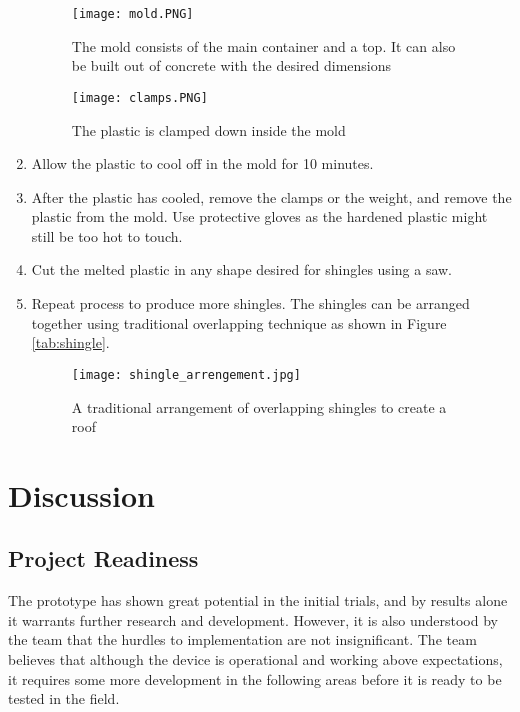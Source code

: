 \documentclass[11pt,english]{article}
\begin{document}
\begin{enumerate}
\begin{figure}[ht!]
\centering
\texttt{[image: mold.PNG]}
\caption{The mold consists of the main container and a top. It can also be built out of concrete with the desired dimensions}
\label{fig:mold}
\end{figure}

\begin{figure}[ht!]
\centering
\texttt{[image: clamps.PNG]}
\caption{The plastic is clamped down inside the mold}
\label{fig:clamps}
\end{figure}


\item Allow the plastic to cool off in the mold for 10 minutes.
\item After the plastic has cooled, remove the clamps or the weight, and remove the plastic from the mold. Use protective gloves as the hardened plastic might still be too hot to touch.
\item Cut the melted plastic in any shape desired for shingles using a saw.
\item Repeat process to produce more shingles. The shingles can be arranged together using traditional overlapping technique as shown in Figure \ref{tab:shingle}.

\begin{figure}[ht!]
\centering
\texttt{[image: shingle\_arrengement.jpg]}
\caption{A traditional arrangement of overlapping shingles to create a roof}
\label{fig:shingle}
\end{figure}
\end{enumerate}


\pagebreak
\section{Discussion}

\subsection{Project Readiness}
The prototype has shown great potential in the initial trials, and by results alone it warrants further research and development. However, it is also understood by the team that the hurdles to implementation are not insignificant. The team believes that although the device is operational and working above expectations, it requires some more development in the following areas before it is ready to be tested in the field. 
\end{document}
